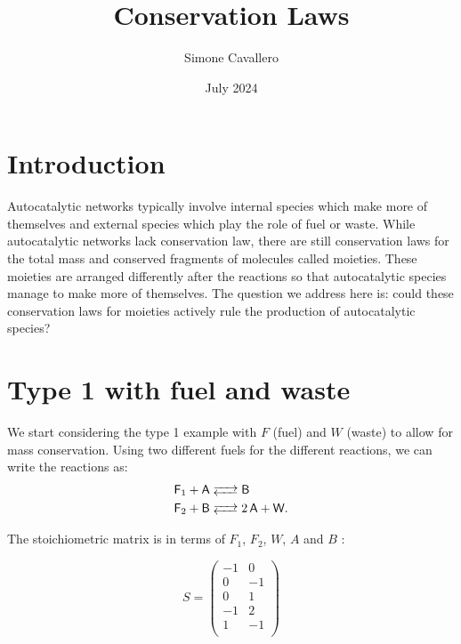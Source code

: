 \documentclass{article}
\title{Conservation Laws}
\author{Simone Cavallero}
\date{July 2024}
\begin{document}
\maketitle

\section{Introduction}
Autocatalytic networks typically involve internal species which make more of themselves and external species which play the role of fuel or waste. While autocatalytic networks lack conservation law, there are still conservation laws for the total mass and conserved fragments of molecules called moieties. These moieties are arranged differently after the reactions so that autocatalytic species manage to make more of themselves. The question we address here is: could these conservation laws for moieties actively rule the production of autocatalytic species? 

\section{Type 1 with fuel and waste}

We start considering the type 1 example with $F$ (fuel) and $W$ (waste) to allow for mass conservation. Using two different fuels for the different reactions, we can write the reactions as:
\begin{equation}
\label{set_reactions}
		\begin{split}
		\ce{\textsf{F}_1 + \textsf{A} & <--> \textsf{B} } \\ 
\ce{\textsf{F}_2 + \textsf{B} & <--> 2 \textsf{A} + \textsf{W}}.	
		\end{split} 
\end{equation}



The stoichiometric matrix is in terms of $F_1$, $F_2$, $W$, $A$ and $B$ :
\begin{center}
    \begin{equation}
        S=\begin{pmatrix}
            -1 & 0 \\
            0 & -1 \\
            0 & 1 \\
            -1 & 2 \\
            1 & -1 \\
        \end{pmatrix}
    \end{equation}
\end{center}
\end{document}

